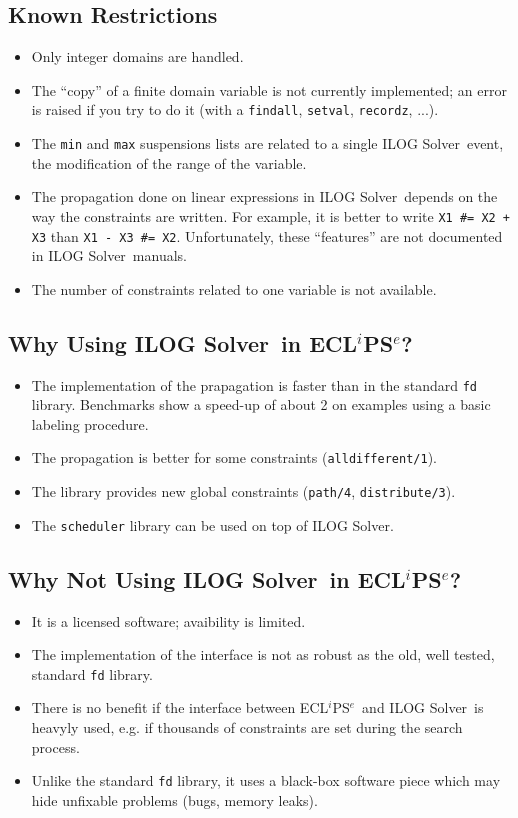 \documentclass{article}
\newcommand{\solver}{ILOG Solver}
\newcommand{\eclipse}{ECL$^i$PS$^e$}
\begin{document}
\subsection{Known Restrictions}

\begin{itemize}
 \item Only integer domains are handled.
 \item The ``copy'' of a finite domain variable is not currently implemented;
 an error is raised if you try to do it (with a \verb"findall",
 \verb"setval", \verb"recordz", ...).
 \item The \verb"min" and \verb"max" suspensions lists are related to a single
\solver\ event, the modification of the range of the variable.
 \item The propagation done on linear expressions in \solver\ depends on the
 way the constraints are written. For example, it is better to write
 \verb"X1 #= X2 + X3" than \verb"X1 - X3 #= X2". Unfortunately, these
 ``features'' are not documented in \solver\ manuals.
 \item The number of constraints related to one variable is not available.
\end{itemize}

\subsection{Why Using \solver\ in \eclipse?}

\begin{itemize}
 \item The implementation of the prapagation is faster than in the standard
 \verb"fd" library. Benchmarks show a speed-up of about 2 on examples using a basic
 labeling procedure.
 \item The propagation is better for some constraints (\verb"alldifferent/1").
 \item The library provides new global constraints (\verb"path/4",
 \verb"distribute/3").
 \item The \verb"scheduler" library can be used on top of \solver.
\end{itemize}

\subsection{Why Not Using \solver\ in \eclipse?}

\begin{itemize}
 \item It is a licensed software; avaibility is limited.
 \item The implementation of the interface is not as robust as the old, well
tested, standard \verb"fd" library.
 \item There is no benefit if the interface between \eclipse\ and \solver\ is
 heavyly used, e.g. if thousands of constraints are set during the search
 process.
 \item Unlike the standard \verb"fd" library, it uses a black-box software
piece which may hide unfixable problems (bugs, memory leaks).
\end{itemize}
\end{document}
